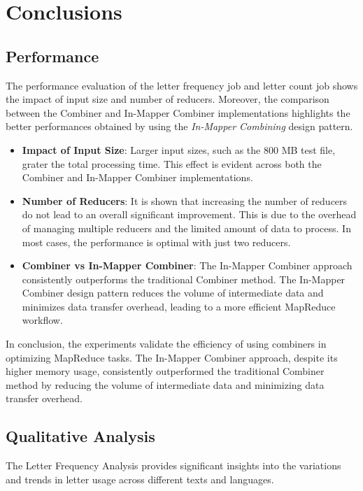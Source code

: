 \newpage
\section{Conclusions}

\subsection{Performance}

The performance evaluation of the letter frequency job and letter count job shows the impact of input size and number of reducers. Moreover, the comparison between the Combiner and In-Mapper Combiner implementations highlights the better performances obtained by using the \textit{In-Mapper Combining} design pattern.

\begin{itemize}
\item \textbf{Impact of Input Size}: Larger input sizes, such as the 800 MB test file, grater the total processing time. This effect is evident across both the Combiner and In-Mapper Combiner implementations.
\item \textbf{Number of Reducers}: It is shown that increasing the number of reducers do not lead to an overall significant improvement. This is due to the overhead of managing multiple reducers and the limited amount of data to process. In most cases, the performance is optimal with just two reducers.

\item \textbf{Combiner vs In-Mapper Combiner}: The In-Mapper Combiner approach consistently outperforms the traditional Combiner method. The In-Mapper Combiner design pattern reduces the volume of intermediate data and minimizes data transfer overhead, leading to a more efficient MapReduce workflow.

\end{itemize}

\noindent In conclusion, the experiments validate the efficiency of using combiners in optimizing MapReduce tasks. The In-Mapper Combiner approach, despite its higher memory usage, consistently outperformed the traditional Combiner method by reducing the volume of intermediate data and minimizing data transfer overhead. 


\subsection{Qualitative Analysis}

The Letter Frequency Analysis provides significant insights into the variations and trends in letter usage across different texts and languages.

